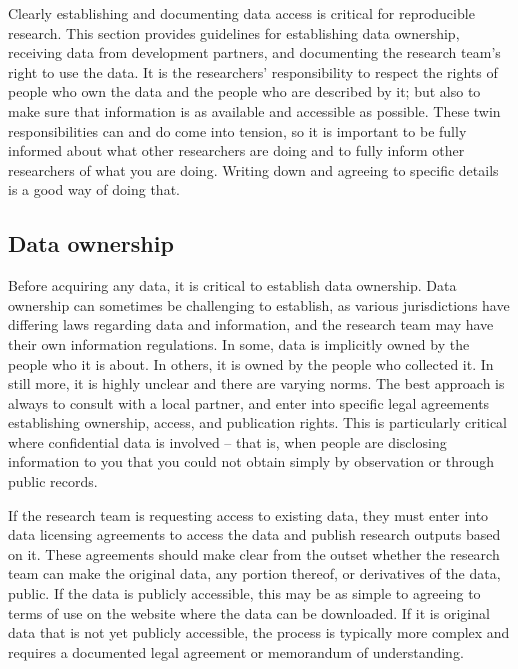 Clearly establishing and documenting data access is critical for reproducible research.
This section provides guidelines for 
establishing data ownership, receiving data from development partners,
and documenting the research team's right to use the data.
It is the researchers' responsibility to respect the rights
of people who own the data and the people who are described by it;
but also to make sure that information is as available and accessible as possible.
These twin responsibilities can and do come into tension,
so it is important to be fully informed about what other researchers are doing
and to fully inform other researchers of what you are doing.
Writing down and agreeing to specific details is a good way of doing that.


\subsection{Data ownership}
Before acquiring any data, it is critical to establish data ownership.
Data ownership
can sometimes be challenging to establish,
as various jurisdictions have differing laws regarding data and information,
and the research team may have their own information regulations.
In some, data is implicitly owned by the people who it is about.
In others, it is owned by the people who collected it.
In still more, it is highly unclear and there are varying norms.
The best approach is always to consult with a local partner,
and enter into specific legal agreements establishing ownership,
access, and publication rights.
This is particularly critical where confidential data is involved
-- that is, when people are disclosing information to you
that you could not obtain simply by observation or through public records.

If the research team is requesting access to existing data, 
they must enter into data licensing agreements
to access the data and publish research outputs based on it.
These agreements should make clear from the outset whether the
research team can make the original data, any portion thereof, or derivatives
of the data, public.
If the data is publicly accessible, 
this may be as simple to agreeing to terms of use on the website where the data can be downloaded. 
If it is original data that is not yet publicly accessible, 
the process is typically more complex and requires a documented legal agreement or memorandum of understanding.

